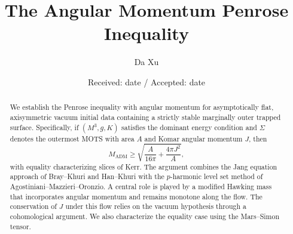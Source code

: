 \documentclass[smallextended]{svjour3}  %
\newcommand{\ADM}{\mathrm{ADM}}
\begin{document}
\title{The Angular Momentum Penrose Inequality}

\author{Da Xu}


\date{Received: date / Accepted: date}

\maketitle

\begin{abstract}
We establish the Penrose inequality with angular momentum for asymptotically flat, axisymmetric vacuum initial data containing a strictly stable marginally outer trapped surface. Specifically, if $(M^3, g, K)$ satisfies the dominant energy condition and $\Sigma$ denotes the outermost MOTS with area $A$ and Komar angular momentum $J$, then
\[
M_{\ADM} \geq \sqrt{\frac{A}{16\pi} + \frac{4\pi J^2}{A}},
\]
with equality characterizing slices of Kerr. The argument combines the Jang equation approach of Bray--Khuri and Han--Khuri with the $p$-harmonic level set method of Agostiniani--Mazzieri--Oronzio. A central role is played by a modified Hawking mass that incorporates angular momentum and remains monotone along the flow. The conservation of $J$ under this flow relies on the vacuum hypothesis through a cohomological argument. We also characterize the equality case using the Mars--Simon tensor.
\end{abstract}

\tableofcontents









\end{document}
